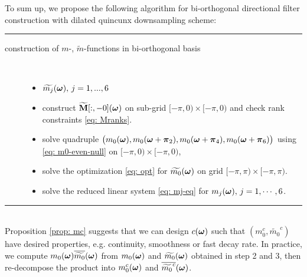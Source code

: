 To sum up, we propose the following algorithm for bi-orthogonal directional filter construction with dilated quincunx downsampling scheme:\\
\rule{\textwidth}{.5pt}
\begin{description}%
\item[construction of $m$-, $\widetilde{m}$-functions in bi-orthogonal basis]\
\begin{itemize}
\item[Input:] $\widetilde{m_{j}}(\boldsymbol{\omega}),\,j=1,...,6$
\item[step 1.] construct $\widetilde{\mathbf{M}}[:,-0](\boldsymbol{\omega})$ on sub-grid $[-\pi,0)\times[-\pi,0)$ and check rank constraints \eqref{eq: Mranks}.%
\item[step 2.] solve quadruple $\big( m_0(\boldsymbol{\omega}),m_0(\boldsymbol{\omega}+\boldsymbol{\pi}_2), m_0(\boldsymbol{\omega} +\boldsymbol{\pi}_4), m_0(\boldsymbol{\omega}+\boldsymbol{\pi}_6) \big)$ using \eqref{eq: m0-even-null} on $[-\pi,0)\times[-\pi,0)$,%
\item[step 3.] solve the optimization \eqref{eq: opt} for $\widetilde{m_{0}}(\boldsymbol{\omega})$ on grid $[-\pi,\pi)\times[-\pi,\pi)$.
\item[step 4.] solve the reduced linear system \eqref{eq: mj-eq} for $m_j(\boldsymbol{\omega}),\, j = 1,\cdots,6$.%
\end{itemize}
\end{description}
\rule{\textwidth}{.5pt}\\[.5em]

Proposition \ref{prop: mc} suggests that we can design $c(\boldsymbol{\omega})$ such that $(m_0^c,\widetilde{m_0}^c)$ have desired properties, e.g. continuity, smoothness or fast decay rate. In practice, we compute $m_0(\boldsymbol{\omega})\overline{\widetilde{m_{0}}}(\boldsymbol{\omega})$ from $m_0(\boldsymbol{\omega})$ and $\widetilde{m_{0}}(\boldsymbol{\omega})$ obtained in step 2 and 3, then re-decompose the product into $m_0^c(\boldsymbol{\omega})$ and $\overline{\widetilde{m_0}^c}(\boldsymbol{\omega})$.

